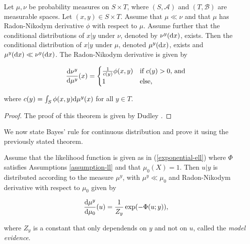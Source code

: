 \begin{theorem}
  \label{duley}
  Let $\mu, \nu$ be probability measures on $S \times T$, where $(S, \mathcal{A})$ and $(T, \mathcal{B})$ are measurable spaces. Let $(x, y) \in S \times T$. Assume that $\mu \ll \nu$ and that $\mu$ has Radon-Nikodym derivative $\phi$ with respect to $\mu$. Assume further that the conditional distributions of $x|y$ under $\nu$, denoted by $\nu^y(\text{d} x)$, exists. Then the conditional distribution of $x|y$ under $\mu$, denoted $\mu^y(\text{d} x)$, exists and $\mu^y(\text{d} x) \ll \nu^y(\text{d} x)$. The Radon-Nikodym derivative is given by

  \begin{equation}
    \frac{\text{d} \nu^y}{\text{d} \mu^y}(x) =  \begin{cases}
      \frac1{c(y)}\phi(x,y) & \text{if $c(y) > 0$, and}\\
      1 & \text{else,}
    \end{cases}  
  \end{equation}

  where $c(y) = \int_{S}\phi(x,y)\text{d} \mu^y(x)$ for all $y \in T$.
\end{theorem}

\begin{proof}
  The proof of this theorem is given by Dudley \cite{dudley_2002}.
\end{proof}

We now state Bayes' rule for continuous distribution and prove it using the previously stated theorem.

\begin{theorem}
  Assume that the likelihood function is given as in (\ref{exponential-ell}) where $\Phi$ satisfies Assumptions \ref{assumption-ll} and that $\mu_0(X) = 1$. Then $u | y$ is distributed according to the measure $\mu^y$, with $\mu^y \ll \mu_0$ and Radon-Nikodym derivative with respect to $\mu_0$ given by

  \begin{equation}
    \frac{\text{d} \mu^y}{\text{d} \mu_0}(u) = \frac1{Z_y}\exp(-\Phi(u;y)),
  \end{equation}

  where $Z_y$ is a constant that only dependends on $y$ and not on $u$, called the \textit{model evidence}.
\end{theorem}


